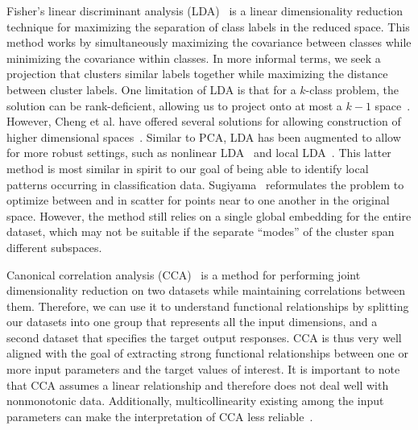 Fisher's linear discriminant analysis (LDA)~\cite{Fisher1936} is a linear dimensionality reduction technique for maximizing the separation of class labels in the reduced space.
%
This method works by simultaneously maximizing the covariance between classes while minimizing the covariance within classes.
%
In more informal terms, we seek a projection that clusters similar labels together while maximizing the distance between cluster labels.
%
One limitation of LDA is that for a $k$-class problem, the solution can be rank-deficient, allowing us to project onto at most a $k-1$ space~\cite{MaszczykDuch2008}.
%
However, Cheng et al. have offered several solutions for allowing construction of higher dimensional spaces~\cite{ChengZhuangYang1992}.
%
Similar to PCA, LDA has been augmented to allow for more robust settings, such as nonlinear LDA~\cite{MikaRatschWeston1999,McLachlan2004} and local LDA~\cite{Sugiyama2006}.
%
This latter method is most similar in spirit to our goal of being able to identify local patterns occurring in classification data.
%
Sugiyama~\cite{Sugiyama2006} reformulates the problem to optimize between and in scatter for points near to one another in the original space.
%
However, the method still relies on a single global embedding for the entire dataset, which may not be suitable if the separate ``modes'' of the cluster span different subspaces.

Canonical correlation analysis (CCA)~\cite{Hotelling1935,HardoonSzedmakShawe-Taylor2004} is a method for performing joint dimensionality reduction on two datasets while maintaining correlations between them.
%
Therefore, we can use it to understand functional relationships by splitting our datasets into one group that represents all the input dimensions, and a second dataset that specifies the target output responses.
%
CCA is thus very well aligned with the goal of extracting strong functional relationships between one or more input parameters and the target values of interest.
%
It is important to note that CCA assumes a linear relationship and therefore does not deal well with nonmonotonic data.
%
Additionally, multicollinearity existing among the input parameters can make the interpretation of CCA less reliable~\cite{HairAndersonTatham1998}.

